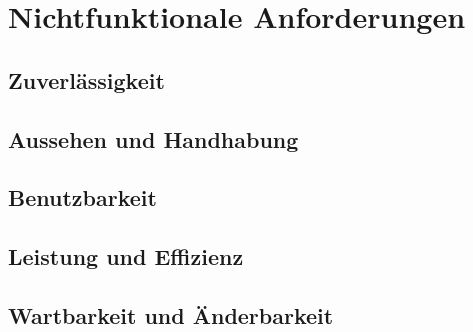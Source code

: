 \chapter{Nichtfunktionale Anforderungen}
\section{Zuverlässigkeit}
\section{Aussehen und Handhabung}
\section{Benutzbarkeit}
\section{Leistung und Effizienz}
\section{Wartbarkeit und Änderbarkeit}
